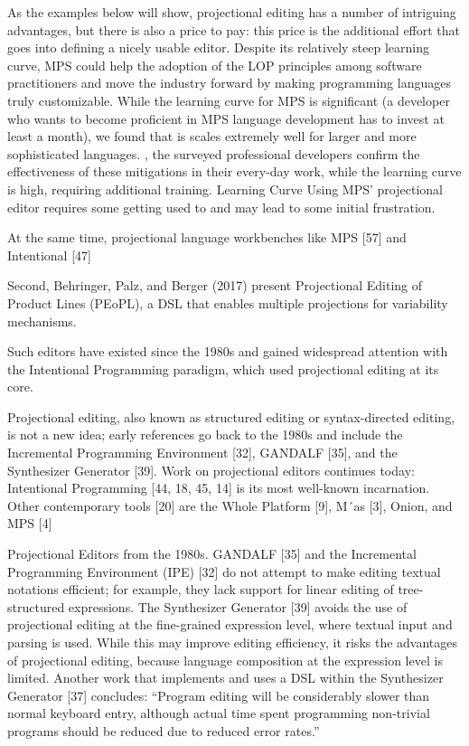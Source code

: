 As the examples below will show, projectional editing has a number of intriguing advantages, but there is also a price to pay: this price is the additional effort that goes into defining a nicely usable editor.
Despite its relatively steep learning curve, MPS could help the adoption of the LOP principles among software practitioners and move the industry forward by making programming languages truly customizable.
While the learning curve for MPS is significant (a developer who wants to become proficient in MPS language development has to invest at least a month), we found that is scales extremely well for larger and more sophisticated languages.
, the surveyed professional developers confirm the effectiveness of these mitigations in their every-day work, while the learning curve is high, requiring additional training.
Learning Curve Using MPS’ projectional editor requires some getting used to and may lead to some initial frustration.









At the same time, projectional language workbenches like MPS [57] and Intentional [47]

Second, Behringer, Palz, and Berger (2017) present Projectional Editing of Product Lines (PEoPL), a DSL that enables multiple projections for variability mechanisms.

Such editors have existed since the 1980s and gained widespread attention with the Intentional Programming paradigm, which used projectional editing at its core.

Projectional editing, also known as structured editing or syntax-directed editing, is not a new idea; early references go back to the 1980s and include the Incremental Programming Environment [32], GANDALF [35], and the Synthesizer Generator [39].
Work on projectional editors continues today: Intentional Programming [44, 18, 45, 14] is its most well-known incarnation.
Other contemporary tools [20] are the Whole Platform [9], M´as [3], Onion, and MPS [4]

Projectional Editors from the 1980s.
GANDALF [35] and the Incremental Programming Environment (IPE) [32] do not attempt to make editing textual notations efficient; for example, they lack support for linear editing of tree-structured expressions.
The Synthesizer Generator [39] avoids the use of projectional editing at the fine-grained expression level, where textual input and parsing is used.
While this may improve editing efficiency, it risks the advantages of projectional editing, because language composition at the expression level is limited.
Another work that implements and uses a DSL within the Synthesizer Generator [37] concludes: “Program editing will be considerably slower than normal keyboard entry, although actual time spent programming non-trivial programs should be reduced due to reduced error rates.”

